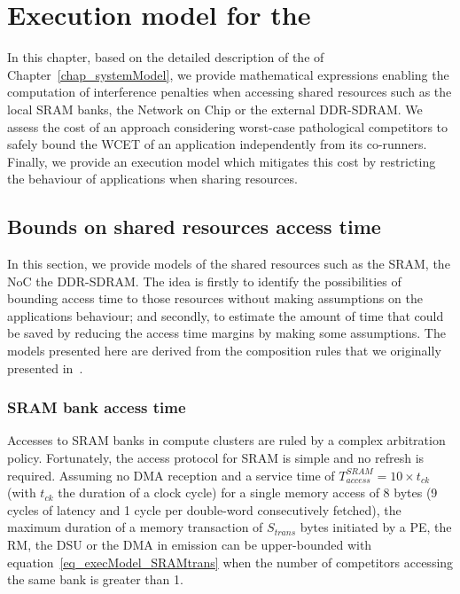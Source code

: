 \documentclass[main.tex]{subfiles}
\begin{document}
\chapter{Execution model for the \mppalong}
\thispagestyle{chapstyle}
\label{chap_execModel}
\minitoc





In this chapter, based on the detailed description of the \mppalong of Chapter~\ref{chap_systemModel}, we provide mathematical expressions enabling the computation of interference penalties when accessing shared resources such as the local SRAM banks, the Network on Chip or the external DDR-SDRAM. We assess the cost of an approach considering worst-case pathological competitors to safely bound the WCET of an application independently from its co-runners. Finally, we provide an execution model which mitigates this cost by restricting the behaviour of applications when sharing resources.


\section{Bounds on shared resources access time}
\label{sec_execModel_boundsSharedRes}

In this section, we provide models of the shared resources such as the SRAM, the NoC the DDR-SDRAM.
The idea is firstly to identify the possibilities of bounding access time to those resources without making assumptions on the applications behaviour; and secondly, to estimate the amount of time that could be saved by reducing the access time margins by making some assumptions. The models presented here are derived from the composition rules that we originally presented in~\cite{Perret16}.


\subsection{SRAM bank access time}
\label{ssec_execModel_SRAMaccessModel}
Accesses to SRAM banks in compute clusters are ruled by a complex arbitration policy.
Fortunately, the access protocol for SRAM is simple and no refresh is required. Assuming no DMA reception and a service time of $T_{access}^{SRAM} = 10 \times t_{ck}$ (with $t_{ck}$ the duration of a clock cycle) for a single memory access of 8 bytes (9 cycles of latency and 1 cycle per double-word consecutively fetched), the maximum duration of a memory transaction of $S_{trans}$ bytes initiated by a PE, the RM, the DSU or the DMA in emission can be upper-bounded with equation~\ref{eq_execModel_SRAMtrans} when the number of competitors accessing the same bank is greater than 1. 
\end{document}
